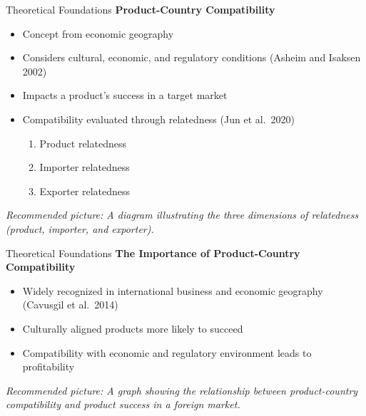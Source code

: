 \documentclass[
  ignorenonframetext,
]{beamer}
\begin{document}
\begin{frame}{Theoretical Foundations}
\protect\hypertarget{theoretical-foundations-3}{}
\textbf{Product-Country Compatibility}

\begin{itemize}
\item
  Concept from economic geography
\item
  Considers cultural, economic, and regulatory conditions (Asheim and
  Isaksen 2002)
\item
  Impacts a product's success in a target market
\item
  Compatibility evaluated through relatedness (Jun et al.~2020)

  \begin{enumerate}
  \item
    Product relatedness
  \item
    Importer relatedness
  \item
    Exporter relatedness
  \end{enumerate}
\end{itemize}

\emph{Recommended picture: A diagram illustrating the three dimensions
of relatedness (product, importer, and exporter).}
\end{frame}

\begin{frame}{Theoretical Foundations}
\protect\hypertarget{theoretical-foundations-4}{}
\textbf{The Importance of Product-Country Compatibility}

\begin{itemize}
\item
  Widely recognized in international business and economic geography
  (Cavusgil et al.~2014)
\item
  Culturally aligned products more likely to succeed
\item
  Compatibility with economic and regulatory environment leads to
  profitability
\end{itemize}

\emph{Recommended picture: A graph showing the relationship between
product-country compatibility and product success in a foreign market.}
\end{frame}
\end{document}
